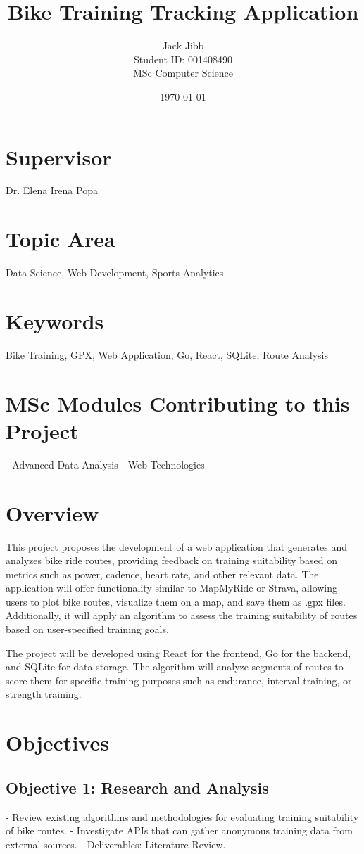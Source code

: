 \documentclass{article}
\title{Bike Training Tracking Application}
\author{Jack Jibb\\ Student ID: 001408490 \\ MSc Computer Science}
\date{\today}
\begin{document}
    \maketitle

    \section*{Supervisor}
    Dr. Elena Irena Popa

    \section*{Topic Area}
    Data Science, Web Development, Sports Analytics

    \section*{Keywords}
    Bike Training, GPX, Web Application, Go, React, SQLite, Route Analysis

    \section*{MSc Modules Contributing to this Project}
    - Advanced Data Analysis
    - Web Technologies

    \section{Overview}
    This project proposes the development of a web application that generates and analyzes bike ride routes, providing feedback on training suitability based on metrics such as power, cadence, heart rate, and other relevant data. The application will offer functionality similar to MapMyRide or Strava, allowing users to plot bike routes, visualize them on a map, and save them as .gpx files. Additionally, it will apply an algorithm to assess the training suitability of routes based on user-specified training goals.

    The project will be developed using React for the frontend, Go for the backend, and SQLite for data storage. The algorithm will analyze segments of routes to score them for specific training purposes such as endurance, interval training, or strength training.

    \section{Objectives}
    \subsection{Objective 1: Research and Analysis}
    - Review existing algorithms and methodologies for evaluating training suitability of bike routes.
    - Investigate APIs that can gather anonymous training data from external sources.
    - Deliverables: Literature Review.
\end{document}
